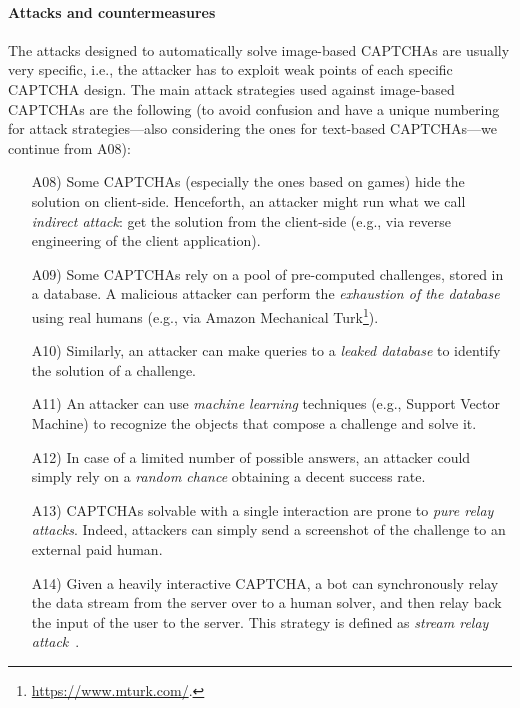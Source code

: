 \documentclass[conference]{IEEEtran}
\begin{document}
\paragraph{Attacks and countermeasures}
The attacks designed to automatically solve image-based CAPTCHAs are usually very specific, i.e., the attacker has to exploit weak points of each specific CAPTCHA design. 
The main attack strategies used against image-based CAPTCHAs are the following (to avoid confusion and have a unique numbering for attack strategies---also considering the ones for text-based CAPTCHAs---we continue from A08):
\begin{enumerate}[leftmargin=1.cm]
\item[A08)]  Some CAPTCHAs (especially the ones based on games) hide the solution on client-side.
   Henceforth, an attacker might run what we call \textit{indirect attack}:  get the solution from the client-side (e.g., via reverse engineering of the client application).
\item[A09)] Some CAPTCHAs rely on a pool of pre-computed challenges, stored in a database.
  A malicious attacker can perform the \textit{exhaustion of the database} using real humans (e.g., via Amazon Mechanical Turk\footnote{\url{https://www.mturk.com/}.}).
\item[A10)] Similarly, an attacker can make queries to a \textit{leaked database} to identify the solution of a challenge.
  \item[A11)] An attacker can use \textit{machine learning} techniques (e.g., Support Vector Machine) to recognize the objects that compose a challenge and solve it. \item[A12)] In case of a limited number of possible answers, an attacker could simply rely on a \textit{random chance} obtaining a decent success rate.
  \item[A13)] CAPTCHAs solvable with a single interaction are prone to \textit{pure relay attacks}. Indeed, attackers can simply send a screenshot of the challenge to an external paid human. \item[A14)] Given a heavily interactive CAPTCHA, a bot can synchronously relay the data stream from the server over to a human solver, and then relay back the input of the user to the server.
  This strategy is defined as \textit{stream relay attack}~\cite{mohamed2014three}.
  
\end{enumerate}
\end{document}
